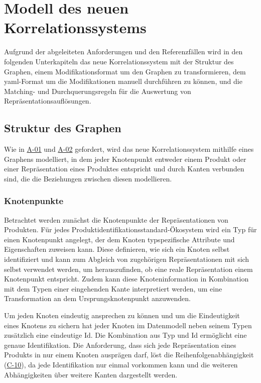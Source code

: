\section{Modell des neuen Korrelationssystems}\label{sec:model-modellierungsansatz}

Aufgrund der abgeleiteten Anforderungen und den Referenzfällen wird in den folgenden Unterkapiteln das neue Korrelationssystem mit der Struktur des Graphen, einem Modifikationsformat um den Graphen zu transformieren, dem \acrshort{yaml}-Format um die Modifikationen manuell durchführen zu können, und die Matching- und Durchquerungsregeln für die Auswertung von Repräsentationsauflösungen.

\subsection{Struktur des Graphen}\label{subsec:model-graph-struktur}

Wie in \hyperref[subsec:req-format-product-graph]{A-01} und \hyperref[subsec:req-product-concept]{A-02} gefordert, wird das neue Korrelationssystem mithilfe eines Graphens modelliert, in dem jeder Knotenpunkt entweder einem Produkt oder einer Repräsentation eines Produktes entspricht und durch Kanten verbunden sind, die die Beziehungen zwischen diesen modellieren.

\subsubsection{Knotenpunkte}\label{subsubsec:model-graph-knoten}

Betrachtet werden zunächst die Knotenpunkte der Repräsentationen von Produkten.
Für jedes Produktidentifikationsstandard-Ökosystem wird ein Typ für einen Knotenpunkt angelegt, der dem Knoten typspezifische Attribute und Eigenschaften zuweisen kann.
Diese definieren, wie sich ein Knoten selbst identifiziert und kann zum Abgleich von zugehörigen Repräsentationen mit sich selbst verwendet werden, um herauszufinden, ob eine reale Repräsentation einem Knotenpunkt entspricht.
Zudem kann diese Knoteninformation in Kombination mit dem Typen einer eingehenden Kante interpretiert werden, um eine Transformation an dem Ursprungsknotenpunkt anzuwenden.

Um jeden Knoten eindeutig ansprechen zu können und um die Eindeutigkeit eines Knotens zu sichern hat jeder Knoten im Datenmodell neben seinem Typen zusätzlich eine eindeutige Id.
Die Kombination aus Typ und Id ermöglicht eine genaue Identifikation.
Die Anforderung, dass sich jede Repräsentation eines Produkts in nur einem Knoten ausprägen darf, löst die Reihenfolgenabhängigkeit (\hyperref[subsec:c-10-order-dependency]{C-10}), da jede Identifikation nur einmal vorkommen kann und die weiteren Abhängigkeiten über weitere Kanten dargestellt werden.

